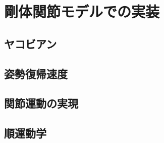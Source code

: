 \documentclass[a4paper,10pt, twocolumn, fleqn]{jsarticle}
\begin{document}
\section{剛体関節モデルでの実装}

\subsection{ヤコビアン} \label{sec_jacobian}


\subsection{姿勢復帰速度} \label{sec_pullback}


\subsection{関節運動の実現}


\subsection{順運動学}



\newpage


\end{document}
